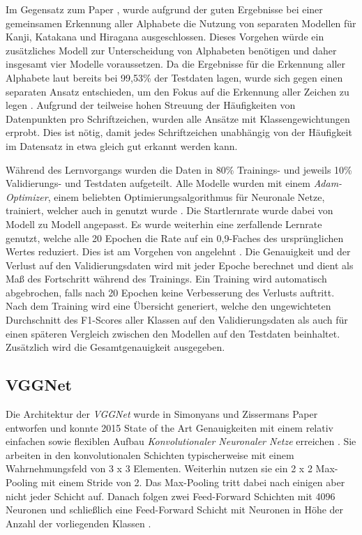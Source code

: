 \documentclass[twoside,a4paper]{IEEEtran}
\begin{document}
Im Gegensatz zum Paper \cite{RHC}, wurde aufgrund der guten Ergebnisse bei einer gemeinsamen Erkennung aller Alphabete die Nutzung von separaten Modellen für Kanji, Katakana und Hiragana ausgeschlossen. Dieses Vorgehen würde ein zusätzliches Modell zur Unterscheidung von Alphabeten benötigen und daher insgesamt vier Modelle voraussetzen. Da die Ergebnisse für die Erkennung aller Alphabete laut \cite{RHC} bereits bei 99,53\% der Testdaten lagen, wurde sich gegen einen separaten Ansatz entschieden, um den Fokus auf die Erkennung aller Zeichen zu legen \cite[S.4-6]{RHC}. Aufgrund der teilweise hohen Streuung der Häufigkeiten von Datenpunkten pro Schriftzeichen, wurden alle Ansätze mit Klassengewichtungen erprobt. Dies ist nötig, damit jedes Schriftzeichen unabhängig von der Häufigkeit im Datensatz in etwa gleich gut erkannt werden kann.

Während des Lernvorgangs wurden die Daten in 80\% Trainings- und jeweils 10\% Validierungs- und Testdaten aufgeteilt. Alle Modelle wurden mit einem \emph{Adam-Optimizer}, einem beliebten Optimierungsalgorithmus für Neuronale Netze, trainiert, welcher auch in \cite{RHC} genutzt wurde \cite[S.4]{RHC}. Die Startlernrate wurde dabei von Modell zu Modell angepasst. Es wurde weiterhin eine zerfallende Lernrate genutzt, welche alle 20 Epochen die Rate auf ein 0,9-Faches des ursprünglichen Wertes reduziert. Dies ist am Vorgehen von \cite{RHC} angelehnt \cite[S.4]{RHC}. Die Genauigkeit und der Verlust auf den Validierungsdaten wird mit jeder Epoche berechnet und dient als Maß des Fortschritt während des Trainings. Ein Training wird automatisch abgebrochen, falls nach 20 Epochen keine Verbesserung des Verlusts auftritt. Nach dem Training wird eine Übersicht generiert, welche den ungewichteten Durchschnitt des F1-Scores aller Klassen auf den Validierungsdaten als auch für einen späteren Vergleich zwischen den Modellen auf den Testdaten beinhaltet. Zusätzlich wird die Gesamtgenauigkeit ausgegeben.

\subsection{VGGNet}  %

Die Architektur der \emph{VGGNet} wurde in Simonyans und Zissermans Paper \cite{simonyan2015deep} entworfen und konnte 2015 State of the Art Genauigkeiten mit einem relativ einfachen sowie flexiblen Aufbau \emph{Konvolutionaler Neuronaler Netze} erreichen \cite[S.1]{simonyan2015deep}. Sie arbeiten in den konvolutionalen Schichten typischerweise mit einem Wahrnehmungsfeld von 3 x 3 Elementen. Weiterhin nutzen sie ein 2 x 2 Max-Pooling mit einem Stride von 2. Das Max-Pooling tritt dabei nach einigen aber nicht jeder Schicht auf. Danach folgen zwei Feed-Forward Schichten mit 4096 Neuronen und schließlich eine Feed-Forward Schicht mit Neuronen in Höhe der Anzahl der vorliegenden Klassen \cite[S.2]{simonyan2015deep}.
\end{document}
